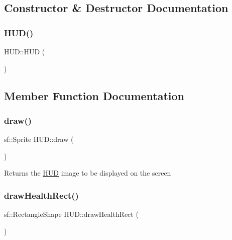 \subsection{Constructor \& Destructor Documentation}
\mbox{\label{class_h_u_d_a568b8ee1591f9ba3ed36ae05966f6b56}} 
\subsubsection{\texorpdfstring{H\+U\+D()}{HUD()}}
{\footnotesize\ttfamily H\+U\+D\+::\+H\+UD (\begin{DoxyParamCaption}{ }\end{DoxyParamCaption})}



\subsection{Member Function Documentation}
\mbox{\label{class_h_u_d_a56cec922eca7a584bdc3799fbeaaf990}} 
\subsubsection{\texorpdfstring{draw()}{draw()}}
{\footnotesize\ttfamily sf\+::\+Sprite H\+U\+D\+::draw (\begin{DoxyParamCaption}{ }\end{DoxyParamCaption})}

Returns the \hyperlink{class_h_u_d}{H\+UD} image to be displayed on the screen \mbox{\label{class_h_u_d_aa87cf43eb5aa5c6e0c050f7d46064fbc}} 
\subsubsection{\texorpdfstring{draw\+Health\+Rect()}{drawHealthRect()}}
{\footnotesize\ttfamily sf\+::\+Rectangle\+Shape H\+U\+D\+::draw\+Health\+Rect (\begin{DoxyParamCaption}{ }\end{DoxyParamCaption})}

\mbox{\label{class_h_u_d_acdbc5c7a94d57dd938a3d5b8514f1d78}} 
